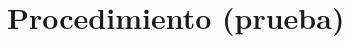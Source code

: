 \documentclass[twocolumn]{IEEEtran}
\begin{document}
\section{Procedimiento (prueba)}



\end{document}
